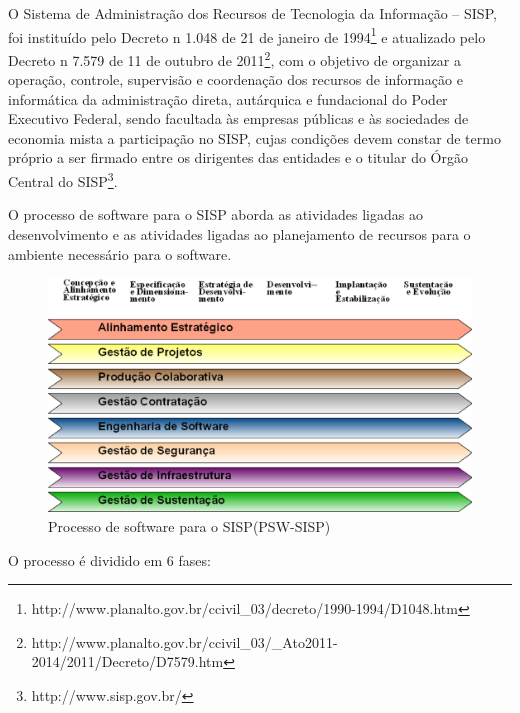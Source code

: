 O Sistema de Administração dos Recursos de Tecnologia da Informação – SISP, 
foi instituído pelo Decreto n 1.048 de 21 de janeiro de 1994\footnote{http://www.planalto.gov.br/ccivil\_03/decreto/1990-1994/D1048.htm}
e atualizado pelo Decreto n 7.579 de 11 de outubro de 2011\footnote{http://www.planalto.gov.br/ccivil\_03/\_Ato2011-2014/2011/Decreto/D7579.htm}, 
com o objetivo de organizar a operação, 
controle, supervisão e coordenação dos recursos de informação e informática da 
administração direta, autárquica e fundacional do Poder Executivo Federal, sendo 
facultada às empresas públicas e às sociedades de economia mista a participação no SISP, 
cujas condições devem constar de termo próprio a ser firmado entre os dirigentes das 
entidades e o titular do Órgão Central do SISP\footnote{http://www.sisp.gov.br/}.

O processo de software para o SISP aborda as atividades ligadas ao desenvolvimento 
e as atividades ligadas ao planejamento de recursos para o ambiente necessário para
o software.
\newpage
\begin{figure}[htpb]
 \begin{center}
    \includegraphics[width=.90\textwidth]{figuras/EstruturaPSW.eps}
 \end{center}
  \caption{Processo de software para o SISP(PSW-SISP)}
  \label{fig:core_concurrent}
\end{figure}

O processo é dividido em 6 fases:

